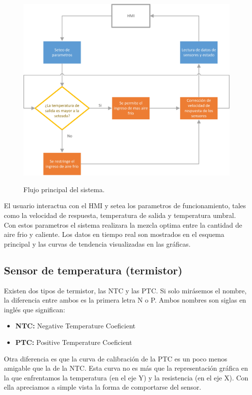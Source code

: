 \documentclass[12pt]{article}
\begin{document}
\begin{figure}[H]
\centering
\includegraphics[scale=0.8]{src/imagenes/Flujo_principal.jpg}
\label{fgr:Flujo_principal}
\caption{Flujo principal del sistema.}
\end{figure}

El usuario interactua con el HMI y setea los parametros de funcionamiento, tales como la velocidad de respuesta, temperatura de salida y temperatura umbral. Con estos parametros el sistema realizara la mezcla optima entre la cantidad de aire frio y caliente. Los datos en tiempo real son mostrados en el esquema principal y las curvas de tendencia visualizadas en las gráficas.

\subsection{Sensor de temperatura (termistor)}

Existen dos tipos de termistor, las NTC y las PTC. Si solo mirásemos el nombre, la diferencia entre ambos es la primera letra N o P. Ambos nombres son siglas en inglés que significan:

\begin{itemize}
	\item \textbf{NTC:} Negative Temperature Coeficient
	\item \textbf{PTC:} Positive Temperature Coeficient
\end{itemize}

Otra diferencia es que la curva de calibración de la PTC es un poco menos amigable que la de la NTC. Esta curva no es más que la representación gráfica en la que enfrentamos la temperatura (en el eje Y) y la resistencia (en el eje X). Con ella apreciamos a simple vista la forma de comportarse del sensor. \\
\end{document}
